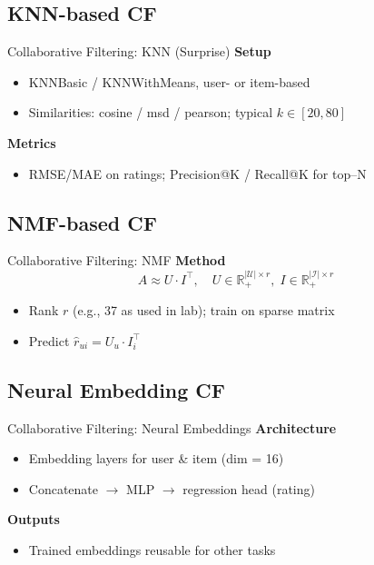 \documentclass[aspectratio=169]{beamer}
\begin{document}
\subsection{KNN-based CF}
\begin{frame}{Collaborative Filtering: KNN (Surprise)}
\textbf{Setup}
\begin{itemize}
  \item KNNBasic / KNNWithMeans, user- or item-based
  \item Similarities: cosine / msd / pearson; typical \(k \in [20, 80]\)
\end{itemize}

\textbf{Metrics}
\begin{itemize}
  \item RMSE/MAE on ratings; Precision@K / Recall@K for top--N
\end{itemize}

\end{frame}

\subsection{NMF-based CF}
\begin{frame}{Collaborative Filtering: NMF}
\textbf{Method}
\[
A \approx U \cdot I^\top,\quad U\in \mathbb{R}_+^{|\mathcal{U}|\times r},\; I\in \mathbb{R}_+^{|\mathcal{I}|\times r}
\]
\begin{itemize}
  \item Rank \(r\) (e.g., 37 as used in lab); train on sparse matrix
  \item Predict \(\hat{r}_{ui} = U_u \cdot I_i^\top\)
\end{itemize}

\end{frame}

\subsection{Neural Embedding CF}
\begin{frame}{Collaborative Filtering: Neural Embeddings}
\textbf{Architecture}
\begin{itemize}
  \item Embedding layers for user \& item (dim = 16)
  \item Concatenate \(\rightarrow\) MLP \(\rightarrow\) regression head (rating)
\end{itemize}

\textbf{Outputs}
\begin{itemize}
  \item Trained embeddings reusable for other tasks
\end{itemize}

\end{frame}
\end{document}

